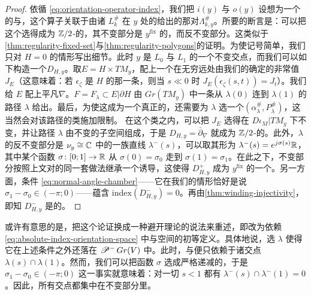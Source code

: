 \begin{proof}
依循 \eqref{eq:orientation-operator-index}，我们把 $i(y)$ 与 $o(y)$ 设想为一个\trOrientationOperator{}的\trIndex{}与\trDeterminantLine，这个算子关联于由诸 $L_k^{\#}$ 在 $y$ 处的\trTangentSpace{}给出的那对\trLinear\trLagrange\trBrane{}$\Lambda^{\#}_{k,y}$。所要的断言是：可以把这个\trOrientationOperator{}选得成为 $\mathbb{Z}/2$-\trEquivariant{}的，其不变部分是 $y^{\mathrm{fix}}$ 的\trOrientationOperator{}，而反不变部分\trInvertible{}。这类似于\cref{thm:regularity-fixed-set}与\cref{thm:regularity-polygons}的证明。为使记号简单，我们只对 $H=0$ 的情形写出细节。此时 $y$ 是 $L_0$ 与 $L_1$ 的一个不变交点，而我们可以如下构造一个\trOrientationOperator{}$D_{H,y}$。取\trVectorBundle{}$E=H\times TM_y$，配上一个在无穷远处由我们的\trFloerDatum{}确定的非常值\trComplexStructure{}$J_E$（这意味着：若 $\epsilon_\zeta$ 是 $H$ 的那一条\trStriplikeEnd{}，则当 $s\ll 0$ 时 $J_E(\epsilon_\zeta(s,t))=J_t$）。我们给 $E$ 配上平凡\trConnection{}$\nabla$。\trSubbundle{}$F=F_\lambda\subset E|\partial H$ 由 $Gr(TM_y)$ 中一条从 $\lambda(0)$ 连到 $\lambda(1)$ 的路径 $\lambda$ 给出。最后，为使这成为一个真正的\trOrientationOperator{}，还需要为 $\lambda$ 选一个\trBraneStructure{}$(\alpha_\lambda^{\#},P_\lambda^{\#})$，这当然会对该路径的\trHomotopy{}类施加限制。
在这个类之内，可以把 $J_E$ 选得在 $D\iota_M|TM_y$ 下不变，并让路径 $\lambda$ 由不变的\trLagrange{}子空间组成，于是 $D_{H,y}=\bar\partial_\nabla$ 就成为 $\mathbb{Z}/2$-\trEquivariant{}的。此外，$\lambda$ 的反不变部分是 $\nu_y\cong\mathbb{C}$ 中的一族直线 $\lambda^-(s)$，可以取其形为 $\lambda^-(s)=e^{j\sigma(s)}\mathbb{R}$，其中某个函数 $\sigma\colon[0;1]\to\mathbb{R}$ 从 $\sigma(0)=\sigma_0$ 走到 $\sigma(1)=\sigma_1$。在此之下，不变部分按照上文对\trLagrange\trSubmanifold{}的同一套做法继承一个诱导\trBraneStructure{}，这使得 $D^+_{H,y}$ 成为 $y^{\mathrm{fix}}$ 的一个\trOrientationOperator{}。另一方面，条件 \eqref{eq:normal-angle-chamber}——它在我们的情形恰好是说 $\sigma_1-\sigma_0\in(-\pi;0)$——蕴含 $\mathrm{index}(D^-_{H,y})=0$。再由\cref{thm:winding-injectivity}，即知 $D^-_{H,y}$ 是\trInvertible{}的。
\end{proof}
\begin{remark}\label{thm:index-free-signs-rephrase}
或许有意思的是，把这个论证换成一种避开\trIndex{}理论的说法来重述，即改为依赖 \eqref{eq:absolute-index-orientation-space} 中\trIndex{}与\trOrientation{}空间的初等定义。具体地说，选 $\lambda$ 使得它在上述条件之外还落在 $\mathscr{P}^-\,Gr(V)$ 中。此时，\trIndex{}与\trDeterminantLine{}便只依赖于诸交点 $\lambda(s)\cap\lambda(1)$。然而，我们可以把函数 $\sigma$ 选成严格递减的，于是 $\sigma_1-\sigma_0\in(-\pi;0)$ 这一事实就意味着：对一切 $s<1$ 都有 $\lambda^-(s)\cap\lambda^-(1)=0$。因此，所有交点都集中在不变部分里。
\end{remark}
